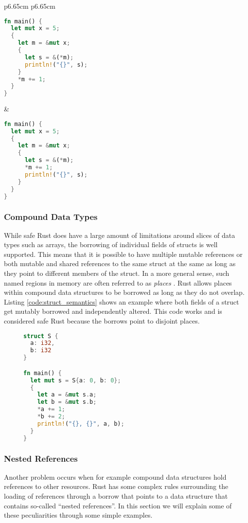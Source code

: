 \noindent
\begin{tabular}{p{6.65cm} p{6.65cm}}
    \begin{lstlisting}[language=Rust,frame=single,caption=Reborrow example,label=code:reborrow_semantics]
fn main() {
  let mut x = 5;
  {
    let m = &mut x;
    {
      let s = &(*m);
      println!("{}", s);
    }
    *m += 1;
  }
}
    \end{lstlisting}

    &

    \begin{lstlisting}[language=Rust,frame=single,caption=Wrong Example,label=code:reborrow_semantics_wrong]
fn main() {
  let mut x = 5;
  {
    let m = &mut x;
    {
      let s = &(*m);
      *m += 1;
      println!("{}", s);
    }
  }
}
    \end{lstlisting}
\end{tabular}

\subsubsection{Compound Data Types}
While safe Rust does have a large amount of limitations around slices of data types such as arrays, the borrowing of individual fields of structs is well supported.
This means that it is possible to have multiple mutable references or both mutable and shared references to the same struct at the same as long as they point to different members of the struct.
In a more general sense, such named regions in memory are often referred to as \textit{places} \cite{2019arXiv190300982W}.
Rust allows places within compound data structures to be borrowed as long as they do not overlap.
Listing \ref{code:struct_semantics} shows an example where both fields of a struct get mutably borrowed and independently altered.
This code works and is considered safe Rust because the borrows point to disjoint places.

\begin{figure}[h]
\begin{lstlisting}[language=Rust,frame=single,caption=Borrowing struct fields,label=code:struct_semantics]
struct S {
  a: i32,
  b: i32
}

fn main() {
  let mut s = S{a: 0, b: 0};
  {
    let a = &mut s.a;
    let b = &mut s.b;
    *a += 1;
    *b += 2;
    println!("{}, {}", a, b);
  }
}
\end{lstlisting}
\end{figure}

\subsubsection{Nested References}
\label{sec:rust_nested}
Another problem occurs when for example compound data structures hold references to other resources.
Rust has some complex rules surrounding the loading of references through a borrow that points to a data structure that contains so-called ``nested references''.
In this section we will explain some of these peculiarities through some simple examples.

